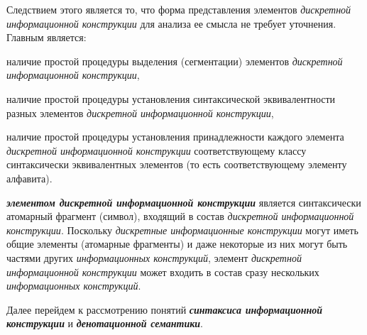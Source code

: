 Следствием этого является то, что форма представления элементов \textit{дискретной информационной конструкции} для анализа ее смысла не требует уточнения.
Главным является:
\begin{textitemize}
    \item наличие простой процедуры выделения (сегментации) элементов \textit{\textit{дискретной информационной конструкции}},
    \item наличие простой процедуры установления синтаксической эквивалентности разных элементов \textit{дискретной информационной конструкции},
    \item наличие простой процедуры установления принадлежности каждого элемента \textit{дискретной информационной конструкции} соответствующему классу синтаксически эквивалентных элементов (то есть соответствующему элементу алфавита).
\end{textitemize}

\textbf{\textit{элементом дискретной информационной конструкции}} является синтаксически атомарный фрагмент (символ), входящий в состав \textit{дискретной информационной конструкции}.
Поскольку \textit{дискретные информационные конструкции} могут иметь общие элементы (атомарные фрагменты) и даже некоторые из них могут быть частями других \textit{информационных конструкций}, элемент \textit{дискретной информационной конструкции} может входить в состав сразу нескольких \textit{информационных конструкций}.

Далее перейдем к рассмотрению понятий \textbf{\textit{синтаксиса информационной конструкции}} и \textbf{\textit{денотационной семантики}}.

